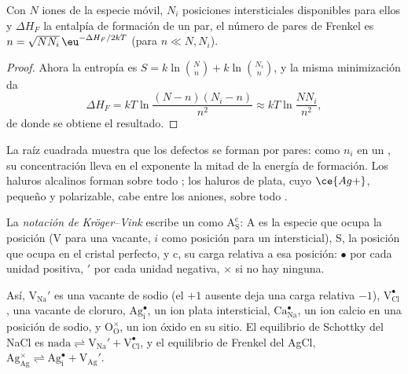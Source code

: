 \begin{proposition}\label{prop:b3:solid-state:frenkel}
Con $N$ iones de la especie móvil, $N_i$ posiciones intersticiales disponibles para ellos y
$\Delta H_F$ la entalpía de formación de un par, el número de pares de Frenkel es $n =
\sqrt{NN_i}\,\eu^{-\Delta H_F/2kT}$ (para $n \ll N, N_i$).
\end{proposition}

\begin{proof}
Ahora la entropía es $S = k\ln\binom{N}{n} + k\ln\binom{N_i}{n}$, y la misma minimización da
\[
  \Delta H_F = kT\ln\frac{(N - n)(N_i - n)}{n^2} \approx kT\ln\frac{NN_i}{n^2},
\]
de donde se obtiene el resultado.
\end{proof}

La raíz cuadrada muestra que los defectos se forman por pares: como $n_i$ en un ,
su concentración lleva en el exponente la mitad de la energía de formación. Los haluros
alcalinos forman sobre todo ; los haluros de plata, cuyo
$\ce{Ag+}$, pequeño y polarizable, cabe entre los aniones, sobre todo .

\begin{definition}\label{def:b3:solid-state:kroger-vink}
La \emph{notación de Kröger--Vink} escribe un 
como $\mathrm{A_S^c}$: A es la especie que ocupa la posición (V para una vacante, $i$ como posición
para un intersticial), S, la posición que ocupa en el cristal perfecto, y c, su
carga relativa a esa posición: $\bullet$ por cada unidad positiva, $'$ por cada unidad
negativa, $\times$ si no hay ninguna.
\end{definition}

Así, $\mathrm{V_{Na}'}$ es una vacante de sodio (el $+1$ ausente deja una carga relativa $-1$),
$\mathrm{V_{Cl}^{\bullet}}$, una vacante de cloruro, $\mathrm{Ag_i^{\bullet}}$, un ion plata intersticial, $\mathrm{Ca_{Na}^{\bullet}}$, un ion calcio en una
posición de sodio, y $\mathrm{O_O^{\times}}$, un ion óxido en su sitio. El equilibrio de Schottky del NaCl es
$\text{nada} \rightleftharpoons \mathrm{V_{Na}' + V_{Cl}^{\bullet}}$, y el equilibrio de Frenkel del AgCl,
$\mathrm{Ag_{Ag}^{\times}} \rightleftharpoons \mathrm{Ag_i^{\bullet} + V_{Ag}'}$.

